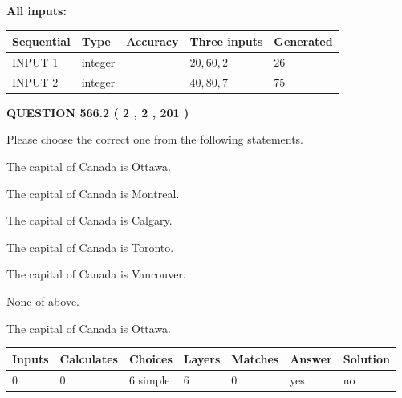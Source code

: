 \documentclass[12pt]{article}
\begin{document}
   
   
   
\noindent\vspace{0.1in}\hspace{-0.08in} {\textbf{\Large{All inputs: }}}
   
   
  
  
\noindent\begin{tabular}{|l|l|l|l|l|}
\hline
 Sequential & Type & Accuracy & Three inputs & Generated \\ 
\hline
 
 
  INPUT $  1 $ & integer &  & $
 20
 , 
 60
 , 
 2
 $ & $ 26 $ 
 \\  \hline  
 
 
  INPUT $  2 $ & integer &  & $
 40
 , 
 80
 , 
 7
 $ & $ 75 $ 
 \\  \hline  
 \end{tabular}
   
   
  
\vspace{0.2in}
  
{\textbf{\Large{QUESTION
566.2 
 ( 2 , 2 , 201 )
}}}
  
  
Please choose the correct one from the following statements.
 
 
The capital of Canada is Ottawa.
 
 
The capital of Canada is Montreal.
 
 
The capital of Canada is Calgary.
 
 
The capital of Canada is Toronto.
 
 
The capital of Canada is Vancouver.
 
 
 None of above.
 
 
\noindent{}
 
 
The capital of Canada is Ottawa.
 
 
\noindent{}
 
 
   
   
   
   
\noindent\begin{tabular}{|l|l|l|l|l|l|l|}
 \hline
Inputs & Calculates & Choices & Layers & Matches & Answer & Solution \\ \hline
 0  & 
 0  & 
 6
  simple  
  & 
 6  & 
 0  & 
  yes & 
  no 
  \\ \hline
 \end{tabular}
   
\end{document}
